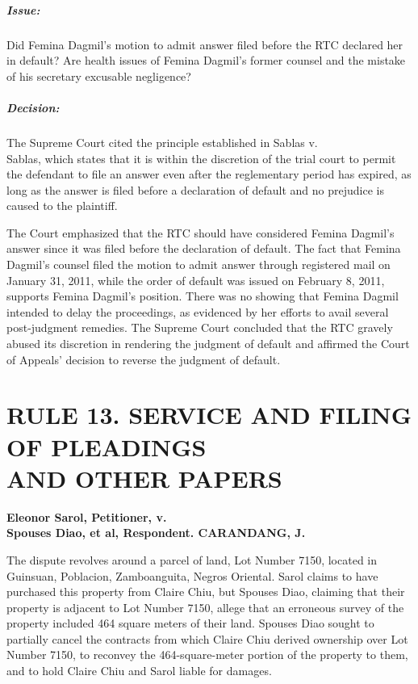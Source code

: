 \documentclass[
12pt,
oneside,
onehalfspacing,
headsepline
]{DigestCollection}
\begin{document}
\paragraph{Issue:}


Did Femina Dagmil's motion to admit answer filed before the RTC declared her in default? Are health issues of Femina Dagmil's former counsel and the mistake of his secretary excusable negligence?

\paragraph{Decision:}

The Supreme Court cited the principle established in Sablas v. \\Sablas, which states that it is within the discretion of the trial court to permit the defendant to file an answer even after the reglementary period has expired, as long as the answer is filed before a declaration of default and no prejudice is caused to the plaintiff.

The Court emphasized that the RTC should have considered Femina Dagmil's answer since it was filed before the declaration of default. The fact that Femina Dagmil's counsel filed the motion to admit answer through registered mail on January 31, 2011, while the order of default was issued on February 8, 2011, supports Femina Dagmil's position. There was no showing that Femina Dagmil intended to delay the proceedings, as evidenced by her efforts to avail several post-judgment remedies. The Supreme Court concluded that the RTC gravely abused its discretion in rendering the judgment of default and affirmed the Court of Appeals' decision to reverse the judgment of default.

\chapter{RULE 13. SERVICE AND FILING OF PLEADINGS\\ AND OTHER PAPERS }




\noindent\textbf{Eleonor Sarol, Petitioner, v. \\Spouses Diao, et al, Respondent. CARANDANG, J.}\vspace{0.4cm}

The dispute revolves around a parcel of land, Lot Number 7150, located in Guinsuan, Poblacion, Zamboanguita, Negros Oriental. Sarol claims to have purchased this property from Claire Chiu, but Spouses Diao, claiming that their property is adjacent to Lot Number 7150, allege that an erroneous survey of the property included 464 square meters of their land. Spouses Diao sought to partially cancel the contracts from which Claire Chiu derived ownership over Lot Number 7150, to reconvey the 464-square-meter portion of the property to them, and to hold Claire Chiu and Sarol liable for damages.
\end{document}
